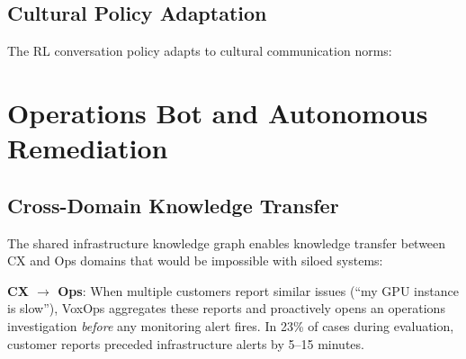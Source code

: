 \documentclass[conference,10pt]{IEEEtran}
\begin{document}
\subsection{Cultural Policy Adaptation}

The RL conversation policy adapts to cultural communication norms:

\begin{table}[!htbp]
\caption{Cultural Adaptation of Conversation Policy}
\label{tab:culture}
\centering\scriptsize
{}
\end{table}

\section{Operations Bot and Autonomous Remediation}
\label{sec:ops}


\subsection{Cross-Domain Knowledge Transfer}

The shared infrastructure knowledge graph enables knowledge transfer between CX and Ops domains that would be impossible with siloed systems:

\textbf{CX $\to$ Ops}: When multiple customers report similar issues (``my GPU instance is slow''), VoxOps aggregates these reports and proactively opens an operations investigation \emph{before} any monitoring alert fires. In 23\% of cases during evaluation, customer reports preceded infrastructure alerts by 5--15 minutes.
\end{document}
